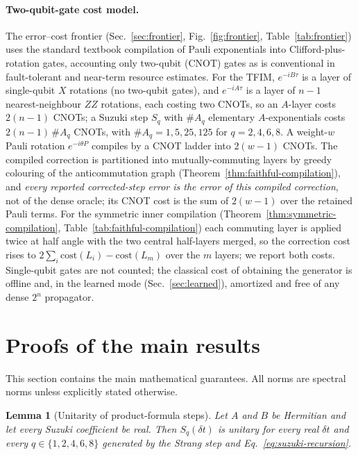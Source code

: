 \documentclass[aps,prxquantum,reprint,superscriptaddress,nofootinbib,amsmath,amssymb]{revtex4-2}
\newcommand{\tfim}{TFIM}
\newcommand{\dt}{\delta t}
\newtheorem{lemma}{Lemma}
\begin{document}
\paragraph{Two-qubit-gate cost model.} The error--cost frontier (Sec.~\ref{sec:frontier}, Fig.~\ref{fig:frontier}, Table~\ref{tab:frontier}) uses the standard textbook compilation of Pauli exponentials into Clifford-plus-rotation gates, accounting only two-qubit (CNOT) gates as is conventional in fault-tolerant and near-term resource estimates. For the \tfim{}, $e^{-iB\tau}$ is a layer of single-qubit $X$ rotations (no two-qubit gates), and $e^{-iA\tau}$ is a layer of $n-1$ nearest-neighbour $ZZ$ rotations, each costing two CNOTs, so an $A$-layer costs $2(n-1)$ CNOTs; a Suzuki step $S_q$ with $\#A_q$ elementary $A$-exponentials costs $2(n-1)\,\#A_q$ CNOTs, with $\#A_q=1,5,25,125$ for $q=2,4,6,8$. A weight-$w$ Pauli rotation $e^{-i\theta P}$ compiles by a CNOT ladder into $2(w-1)$ CNOTs. The compiled correction is partitioned into mutually-commuting layers by greedy colouring of the anticommutation graph (Theorem~\ref{thm:faithful-compilation}), and \emph{every reported corrected-step error is the error of this compiled correction}, not of the dense oracle; its CNOT cost is the sum of $2(w-1)$ over the retained Pauli terms. For the symmetric inner compilation (Theorem~\ref{thm:symmetric-compilation}, Table~\ref{tab:faithful-compilation}) each commuting layer is applied twice at half angle with the two central half-layers merged, so the correction cost rises to $2\sum_i\mathrm{cost}(L_i)-\mathrm{cost}(L_m)$ over the $m$ layers; we report both costs. Single-qubit gates are not counted; the classical cost of obtaining the generator is offline and, in the learned mode (Sec.~\ref{sec:learned}), amortized and free of any dense $2^n$ propagator.

\section{Proofs of the main results}
\label{app:proofs}

This section contains the main mathematical guarantees. All norms are spectral norms unless explicitly stated otherwise.

\begin{lemma}[Unitarity of product-formula steps]
\label{lem:Sq-unitary}
Let $A$ and $B$ be Hermitian and let every Suzuki coefficient be real. Then $S_q(\dt)$ is unitary for every real $\dt$ and every $q\in\{1,2,4,6,8\}$ generated by the Strang step and Eq.~\eqref{eq:suzuki-recursion}.
\end{lemma}
\end{document}
